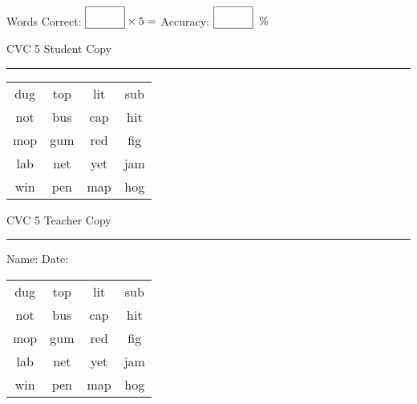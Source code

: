 \documentclass{memoir}
\begin{document}
\normalsize

Words Correct: $\fbox{\phantom{\huge 100}} \times 5 = $ Accuracy: $\fbox{\phantom{\huge 100}}\;\; \%$ 

\vfill

\newpage


\footnotesize \noindent
CVC 5 \hfill Student Copy
\smallskip
\hrule

\huge

\setlength{\tabcolsep}{14pt}
\def\arraystretch{2}

{\selectfont


\begin{vplace}[0.5]
\begin{center}
\begin{tabular}{cccc}
dug & top & lit & sub \\
not & bus & cap & hit \\
mop & gum  & red & fig \\
lab & net & yet & jam \\
win & pen & map & hog \\
\end{tabular}
\end{center}
\end{vplace}

}

\newpage

\footnotesize \noindent
CVC 5 \hfill Teacher Copy
\smallskip
\hrule

\normalsize

\vfill

\noindent
Name: \underline{\hspace{1.75in}} \hfill Date: \underline{\hspace{1in}}

\huge

{\selectfont


\begin{vplace}[0.5]
\begin{center}
\begin{tabular}{cccc}
dug & top & lit & sub \\
not & bus & cap & hit \\
mop & gum  & red & fig \\
lab & net & yet & jam \\
win & pen & map & hog \\
\end{tabular}
\end{center}
\end{vplace}



}
\end{document}
